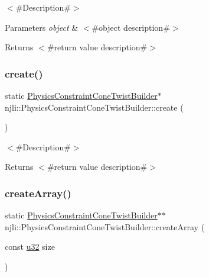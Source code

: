 $<$\#\+Description\#$>$


\begin{DoxyParams}{Parameters}
{\em object} & $<$\#object description\#$>$\\
\hline
\end{DoxyParams}
\begin{DoxyReturn}{Returns}
$<$\#return value description\#$>$ 
\end{DoxyReturn}
\mbox{\label{classnjli_1_1_physics_constraint_cone_twist_builder_a3cc7191ba1b2427d94fbf940500e39b6}} 
\subsubsection{\texorpdfstring{create()}{create()}}
{\footnotesize\ttfamily static \mbox{\hyperlink{classnjli_1_1_physics_constraint_cone_twist_builder}{Physics\+Constraint\+Cone\+Twist\+Builder}}$\ast$ njli\+::\+Physics\+Constraint\+Cone\+Twist\+Builder\+::create (\begin{DoxyParamCaption}{ }\end{DoxyParamCaption})\hspace{0.3cm}{\ttfamily [static]}}

$<$\#\+Description\#$>$

\begin{DoxyReturn}{Returns}
$<$\#return value description\#$>$ 
\end{DoxyReturn}
\mbox{\label{classnjli_1_1_physics_constraint_cone_twist_builder_aa6d0cbd168ffaebe2a46392c579e2b92}} 
\subsubsection{\texorpdfstring{create\+Array()}{createArray()}}
{\footnotesize\ttfamily static \mbox{\hyperlink{classnjli_1_1_physics_constraint_cone_twist_builder}{Physics\+Constraint\+Cone\+Twist\+Builder}}$\ast$$\ast$ njli\+::\+Physics\+Constraint\+Cone\+Twist\+Builder\+::create\+Array (\begin{DoxyParamCaption}\item[{const \mbox{\hyperlink{_util_8h_a10e94b422ef0c20dcdec20d31a1f5049}{u32}}}]{size }\end{DoxyParamCaption})\hspace{0.3cm}{\ttfamily [static]}}

